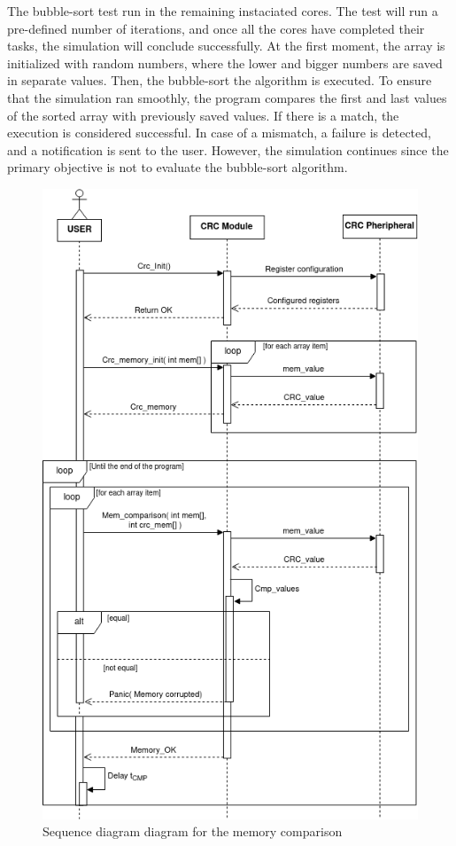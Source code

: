 The bubble-sort test run in the remaining instaciated cores. The test will run a pre-defined number of iterations, and 
once all the cores have completed their tasks, the simulation will conclude successfully. At the first moment, the array 
is initialized with random numbers, where the lower and bigger numbers are saved in separate values. Then, the bubble-sort 
the algorithm is executed. To ensure that the simulation ran smoothly, the program compares the first and last values of 
the sorted array with previously saved values. If there is a match, the execution is considered successful. In case of a 
mismatch, a failure is detected, and a notification is sent to the user. However, the simulation continues since the primary 
objective is not to evaluate the bubble-sort algorithm. 

\begin{figure}[H]
	\centering
 	\includegraphics[width=0.7\linewidth]{Images/MemoryIntegrity_CPU0SequenceDiagram.png}
 	\caption{Sequence diagram diagram for the memory comparison}
	\label{fig_MemoryIntegrity_CPU0SequenceDiagram}
\end{figure}

